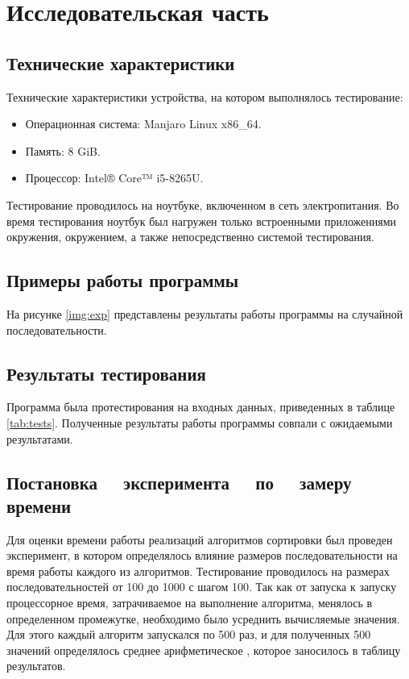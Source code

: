 \chapter{Исследовательская часть}

\section{Технические характеристики}

Технические характеристики устройства, на котором выполнялось тестирование:

\begin{itemize}
	\item Операционная система: Manjaro \cite{manjaro} Linux x86\_64.
	\item Память: 8 GiB.
	\item Процессор: Intel® Core™ i5-8265U\cite{intel}.
\end{itemize}

Тестирование проводилось на ноутбуке, включенном в сеть электропитания. Во
время тестирования ноутбук был нагружен только встроенными приложениями
окружения, окружением, а также непосредственно системой тестирования.

\section{Примеры работы программы}

На рисунке \ref{img:exp} представлены результаты работы программы на случайной
последовательности.


\section{Результаты тестирования}

Программа была протестирования на входных данных, приведенных в таблице
\ref{tab:tests}. Полученные результаты работы программы совпали с ожидаемыми
результатами.

\section[Постановка эксперимента по замеру времени]
        {Постановка ~~эксперимента ~~по ~~замеру времени}

Для оценки времени работы реализаций алгоритмов сортировки был проведен
эксперимент, в котором определялось влияние размеров последовательности на
время работы каждого из алгоритмов. Тестирование проводилось на размерах
последовательностей от 100 до 1000 с шагом 100. Так как от запуска к запуску
процессорное время, затрачиваемое на выполнение алгоритма, менялось в
определенном промежутке, необходимо было усреднить вычисляемые значения. Для
этого каждый алгоритм запускался по 500 раз, и для полученных 500 значений
определялось среднее арифметическое , которое заносилось в таблицу результатов.

